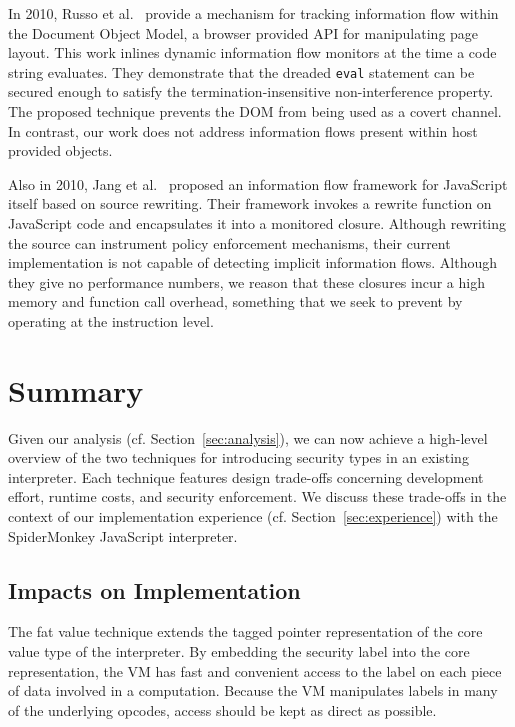 \documentclass[11pt,onecolumn]{article}
\newcommand{\todo}[1]{\textcolor{red}{#1}}
\begin{document}
In 2010, Russo et al.~\cite{1813092} provide a mechanism for tracking information flow within the Document Object Model, a browser provided API for manipulating page layout.
This work inlines dynamic information flow monitors at the time a code string evaluates.
They demonstrate that the dreaded \texttt{eval} statement can be secured enough to satisfy the termination-insensitive non-interference property.
The proposed technique prevents the DOM from being used as a covert channel.
In contrast, our work does not address information flows present within host provided objects.

Also in 2010, Jang et al.~\cite{1866339} proposed an information flow framework for JavaScript itself based on source rewriting.
Their framework invokes a rewrite function on JavaScript code and encapsulates it into a monitored closure.
Although rewriting the source can instrument policy enforcement mechanisms, their current implementation is not capable of detecting implicit information flows.
Although they give no performance numbers, we reason that these closures incur a high memory and function call overhead, something that we seek to prevent by operating at the instruction level.


\section{Summary}\label{sec:summary}

Given our analysis (cf. Section~\ref{sec:analysis}), we can now achieve a high-level overview of the two techniques for introducing security types in an existing interpreter.
Each technique features design trade-offs concerning development effort, runtime costs, and security enforcement.
We discuss these trade-offs in the context of our implementation experience (cf. Section~\ref{sec:experience}) with the SpiderMonkey JavaScript interpreter.

\subsection{Impacts on Implementation}
The fat value technique extends the tagged pointer representation of the core value type of the interpreter.
By embedding the security label into the core representation, the VM has fast and convenient access to the label on each piece of data involved in a computation.
Because the VM manipulates labels in many of the underlying opcodes, access should be kept as direct as possible.
\end{document}
